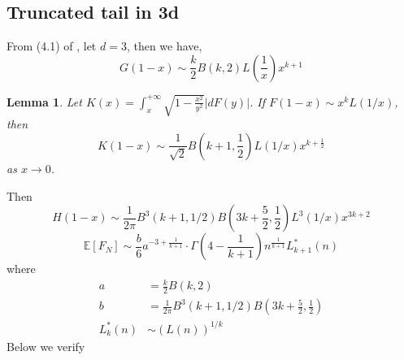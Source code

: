 \documentclass{article}
\newtheorem{lemma}{Lemma}
\def\E{\mathbb{E}}
\begin{document}
\subsection{Truncated tail in 3d}
From (4.1) of \cite{dwyer1991convex}, let $d=3$, then we have,
\begin{equation}
    G(1-x) \sim \frac{k}{2}B(k,2)L
    \left(\frac{1}{x} \right) x^{k+1}
\end{equation}
\begin{lemma}\label{lem:F_x_sqrt_11_truncated}
    Let $K(x)=\int_x^{+\infty} \sqrt{1-\frac{x^2}{y^2}}
    |d F(y)|$.
    If $F(1-x) \sim x^k L(1/x)$, then
    \begin{equation}
         K(1-x)\sim \frac{1}{\sqrt{2}}
         B(k+1,\frac{1}{2}) L(1/x) x^{k+\frac{1}{2}}
    \end{equation}
    as $x\to 0$.
\end{lemma}
Then
\begin{equation}
    H(1-x) \sim \frac{1}{2\pi}
    B^3(k+1,1/2)
    B\left(3k+\frac{5}{2},\frac{1}{2}\right)L^3(1/x)x^{3k+2}
\end{equation}
\begin{equation}
    \E[F_N] \sim \frac{b}{6}
    a^{-3+\frac{1}{k+1}}
    \cdot \Gamma\left(4-\frac{1}{k+1}\right)
    n^{\frac{1}{k+1}} L^*_{k+1}(n)
\end{equation}
where
\begin{align}
a &= \frac{k}{2} B(k,2) \\
b &= \frac{1}{2\pi}B^3(k+1,1/2)
B\left(3k+\frac{5}{2},\frac{1}{2}\right)\\
L^*_k(n) & \sim (L(n))^{1/k}
\end{align}
Below we verify 


\end{document}
